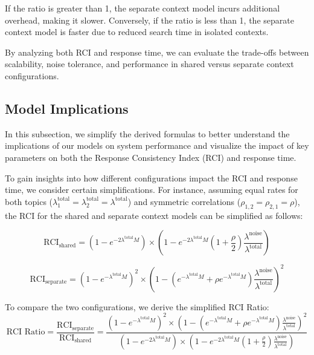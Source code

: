 \documentclass{article}
\begin{document}
If the ratio is greater than 1, the separate context model incurs additional overhead, making it slower. Conversely, if the ratio is less than 1, the separate context model is faster due to reduced search time in isolated contexts.

By analyzing both RCI and response time, we can evaluate the trade-offs between scalability, noise tolerance, and performance in shared versus separate context configurations.

\subsection{Model Implications}

In this subsection, we simplify the derived formulas to better understand the implications of our models on system performance and visualize the impact of key parameters on both the Response Consistency Index (RCI) and response time.

To gain insights into how different configurations impact the RCI and response time, we consider certain simplifications. For instance, assuming equal rates for both topics (\( \lambda_1^{\text{total}} = \lambda_2^{\text{total}} = \lambda^{\text{total}} \)) and symmetric correlations (\( \rho_{1,2} = \rho_{2,1} = \rho \)), the RCI for the shared and separate context models can be simplified as follows:

\[
\text{RCI}_{\text{shared}} = \left(1 - e^{-2 \lambda^{\text{total}} M}\right) \times \left(1 - e^{-2 \lambda^{\text{total}} M} \left(1 + \frac{\rho}{2}\right) \frac{\lambda^{\text{noise}}}{\lambda^{\text{total}}}\right)
\]

\[
\text{RCI}_{\text{separate}} = \left(1 - e^{-\lambda^{\text{total}} M}\right)^2 \times \left(1 - \left(e^{-\lambda^{\text{total}} M} + \rho e^{-\lambda^{\text{total}} M}\right) \frac{\lambda^{\text{noise}}}{\lambda^{\text{total}}}\right)^2
\]

To compare the two configurations, we derive the simplified RCI Ratio:
\[
\text{RCI Ratio} = \frac{\text{RCI}_{\text{separate}}}{\text{RCI}_{\text{shared}}} = \frac{\left(1 - e^{-\lambda^{\text{total}} M}\right)^2 \times \left(1 - \left(e^{-\lambda^{\text{total}} M} + \rho e^{-\lambda^{\text{total}} M}\right) \frac{\lambda^{\text{noise}}}{\lambda^{\text{total}}}\right)^2}{\left(1 - e^{-2 \lambda^{\text{total}} M}\right) \times \left(1 - e^{-2 \lambda^{\text{total}} M} \left(1 + \frac{\rho}{2}\right) \frac{\lambda^{\text{noise}}}{\lambda^{\text{total}}}\right)}
\]
\end{document}
